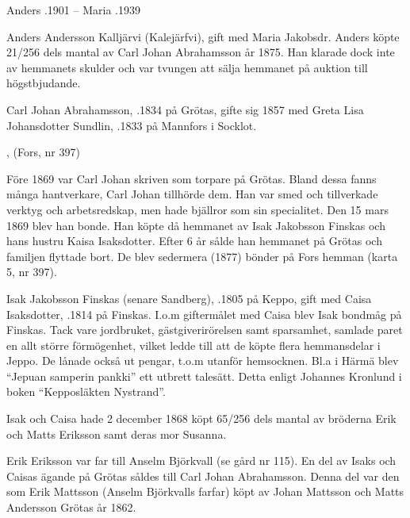 Anders .1901  --  Maria .1939


Anders Andersson Kalljärvi (Kalejärfvi), gift med Maria Jakobsdr. Anders köpte 21/256 dels mantal av Carl Johan Abrahamsson år 1875. Han klarade dock inte av hemmanets skulder och var tvungen att sälja hemmanet på auktion till högstbjudande.


Carl Johan Abrahamsson, .1834 på Grötas, gifte sig 1857 med Greta Lisa Johansdotter Sundlin, .1833 på Mannfors i Socklot.
\begin{jhchildren}
  \item {}, (Fors, nr 397)
  \item {}
  \item {}
  \item {}
  \item {}
  \item {}
\end{jhchildren}
Före 1869 var Carl Johan skriven som torpare på Grötas. Bland dessa fanns många hantverkare, Carl Johan tillhörde dem. Han var smed och tillverkade verktyg och arbetsredskap, men hade bjällror som sin specialitet. Den 15 mars 1869 blev han bonde. Han köpte då  hemmanet av Isak Jakobsson Finskas och hans hustru Kaisa Isaksdotter. Efter 6 år sålde han hemmanet på Grötas och familjen flyttade bort. De blev sedermera (1877) bönder på Fors hemman (karta 5, nr 397).

Isak Jakobsson Finskas (senare Sandberg), .1805 på Keppo, gift med Caisa Isaksdotter, .1814 på Finskas. I.o.m giftermålet med Caisa blev Isak bondmåg på Finskas. Tack vare jordbruket, gästgiverirörelsen samt sparsamhet, samlade paret en allt större förmögenhet, vilket ledde till att de köpte flera hemmansdelar i Jeppo. De lånade också ut pengar, t.o.m utanför hemsocknen. Bl.a i Härmä blev ``Jepuan samperin pankki'' ett utbrett talesätt. Detta enligt Johannes Kronlund i boken ``Kepposläkten Nystrand''.

Isak och Caisa hade 2 december 1868 köpt 65/256 dels mantal av bröderna Erik och Matts Eriksson samt deras mor Susanna.

Erik Eriksson var far till Anselm Björkvall (se gård nr 115). En del av Isaks och Caisas ägande på Grötas såldes till Carl Johan Abrahamsson. Denna del var den som Erik Mattsson (Anselm Björkvalls farfar) köpt av Johan Mattsson och Matts Andersson Grötas år 1862.



